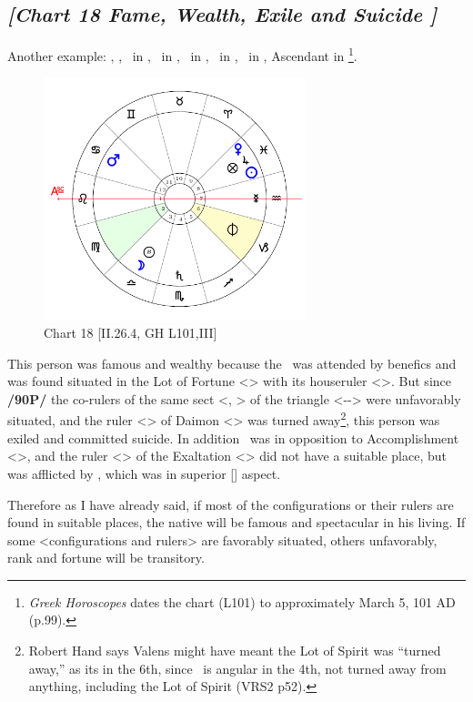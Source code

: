 \newpage
\subsection*{\textit{[Chart 18 Fame, Wealth, Exile and Suicide ]}}

Another example: \Sun, \Jupiter, \Venus\, in \Pisces, \Moon\, in \Libra, \Mars\, in \Cancer, \Mercury\, in \Aquarius, \Saturn\, in \Scorpio, Ascendant in \Leo
\footnote{\textit{Greek Horoscopes} dates the chart (L101) to approximately March 5, 101 AD (p.99).}.

\clearpage
\begin{figure}
\centering

\includegraphics[width=0.68\textwidth]{charts/2_26_4}
\caption{Chart 18 [II.26.4, GH L101,III]}
\label{fig:chart18}
\end{figure}


This person was famous and wealthy because the \Sun\, was attended by benefics and was found situated in the Lot of Fortune <\Pisces> with its houseruler <\Jupiter>. But since \textbf{/90P/} the co-rulers of the same sect <\Mars, \Moon> of the triangle <\Pisces-\Cancer-\Scorpio> were
unfavorably situated, and the ruler <\Saturn> of Daimon <\Capricorn> was turned away\footnote{Robert Hand says Valens might have meant the Lot of Spirit was ``turned away,'' as its in the 6th, since \Saturn\, is angular in the 4th, not turned away from anything, including the Lot of Spirit (VRS2 p52).}, this person was exiled and committed suicide. In addition \Mars\, was in opposition to Accomplishment <\Capricorn>, and the ruler <\Mercury> of the Exaltation <\Virgo> did not have a suitable place, but was afflicted by \Saturn, which was in superior [\Square] aspect.

Therefore \mndl as I have already said, if most of the configurations or their rulers are found in suitable places, the native will be famous and spectacular in his living. If some <configurations and rulers> are favorably situated, others unfavorably, rank and fortune will be transitory.

\newpage